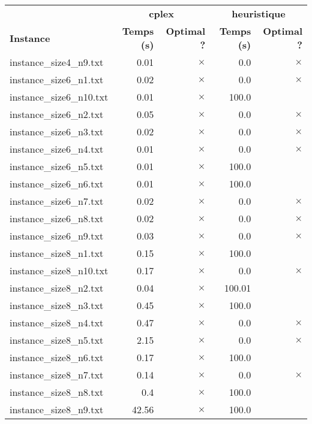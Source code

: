 \documentclass{article}
\begin{document}
\newpage
\begin{center}
\renewcommand{\arraystretch}{1.4}
 \begin{tabular}{lrrrr}
	\hline
 & \multicolumn{2}{c}{\textbf{cplex}} & \multicolumn{2}{c}{\textbf{heuristique}}\\
\textbf{Instance}  & \textbf{Temps (s)} & \textbf{Optimal ?}  & \textbf{Temps (s)} & \textbf{Optimal ?} \\\hline

instance\_size4\_n9.txt & 0.01 & 
$\times$
 & 0.0 & 
$\times$
\\
instance\_size6\_n1.txt & 0.02 & 
$\times$
 & 0.0 & 
$\times$
\\
instance\_size6\_n10.txt & 0.01 & 
$\times$
 & 100.0 & 
\\
instance\_size6\_n2.txt & 0.05 & 
$\times$
 & 0.0 & 
$\times$
\\
instance\_size6\_n3.txt & 0.02 & 
$\times$
 & 0.0 & 
$\times$
\\
instance\_size6\_n4.txt & 0.01 & 
$\times$
 & 0.0 & 
$\times$
\\
instance\_size6\_n5.txt & 0.01 & 
$\times$
 & 100.0 & 
\\
instance\_size6\_n6.txt & 0.01 & 
$\times$
 & 100.0 & 
\\
instance\_size6\_n7.txt & 0.02 & 
$\times$
 & 0.0 & 
$\times$
\\
instance\_size6\_n8.txt & 0.02 & 
$\times$
 & 0.0 & 
$\times$
\\
instance\_size6\_n9.txt & 0.03 & 
$\times$
 & 0.0 & 
$\times$
\\
instance\_size8\_n1.txt & 0.15 & 
$\times$
 & 100.0 & 
\\
instance\_size8\_n10.txt & 0.17 & 
$\times$
 & 0.0 & 
$\times$
\\
instance\_size8\_n2.txt & 0.04 & 
$\times$
 & 100.01 & 
\\
instance\_size8\_n3.txt & 0.45 & 
$\times$
 & 100.0 & 
\\
instance\_size8\_n4.txt & 0.47 & 
$\times$
 & 0.0 & 
$\times$
\\
instance\_size8\_n5.txt & 2.15 & 
$\times$
 & 0.0 & 
$\times$
\\
instance\_size8\_n6.txt & 0.17 & 
$\times$
 & 100.0 & 
\\
instance\_size8\_n7.txt & 0.14 & 
$\times$
 & 0.0 & 
$\times$
\\
instance\_size8\_n8.txt & 0.4 & 
$\times$
 & 100.0 & 
\\
instance\_size8\_n9.txt & 42.56 & 
$\times$
 & 100.0 & 
\\

\end{tabular}
\end{center}
\end{document}
